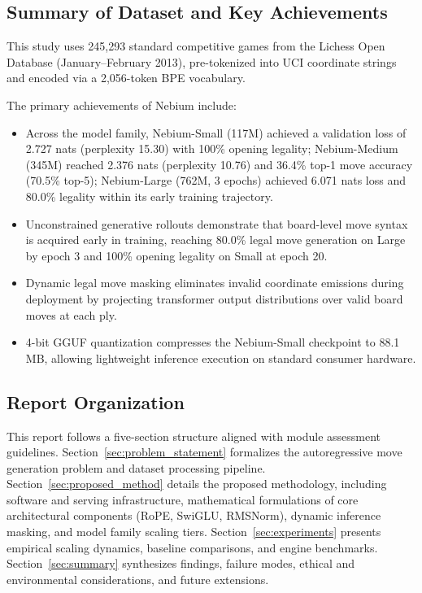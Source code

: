 \subsection{Summary of Dataset and Key Achievements}
\label{sec:intro_achievements}
This study uses 245,293 standard competitive games from the Lichess Open Database (January--February 2013), pre-tokenized into UCI coordinate strings and encoded via a 2,056-token BPE vocabulary.

The primary achievements of Nebium include:
\begin{itemize}
    \item Across the model family, Nebium-Small (117M) achieved a validation loss of 2.727 nats (perplexity 15.30) with 100\% opening legality; Nebium-Medium (345M) reached 2.376 nats (perplexity 10.76) and 36.4\% top-1 move accuracy (70.5\% top-5); Nebium-Large (762M, 3 epochs) achieved 6.071 nats loss and 80.0\% legality within its early training trajectory.
    \item Unconstrained generative rollouts demonstrate that board-level move syntax is acquired early in training, reaching 80.0\% legal move generation on Large by epoch 3 and 100\% opening legality on Small at epoch 20.
    \item Dynamic legal move masking eliminates invalid coordinate emissions during deployment by projecting transformer output distributions over valid board moves at each ply.
    \item 4-bit GGUF quantization compresses the Nebium-Small checkpoint to 88.1 MB, allowing lightweight inference execution on standard consumer hardware.
\end{itemize}

\subsection{Report Organization}
\label{sec:intro_org}
This report follows a five-section structure aligned with module assessment guidelines. Section~\ref{sec:problem_statement} formalizes the autoregressive move generation problem and dataset processing pipeline. Section~\ref{sec:proposed_method} details the proposed methodology, including software and serving infrastructure, mathematical formulations of core architectural components (RoPE, SwiGLU, RMSNorm), dynamic inference masking, and model family scaling tiers. Section~\ref{sec:experiments} presents empirical scaling dynamics, baseline comparisons, and engine benchmarks. Section~\ref{sec:summary} synthesizes findings, failure modes, ethical and environmental considerations, and future extensions.
